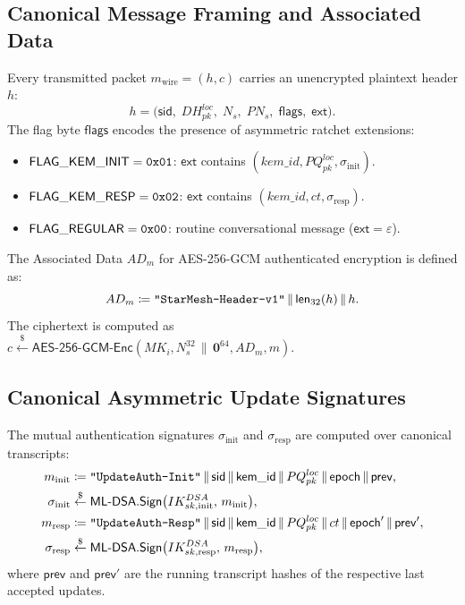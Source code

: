 \documentclass[11pt,a4paper]{article}
\theoremstyle{remark}
\theoremstyle{plain}
\newcommand{\getsr}{\stackrel{\$}{\leftarrow}}
\newcommand{\MLDSA}{\mathsf{ML\text{-}DSA}}
\newcommand{\Sign}{\mathsf{Sign}}
\newcommand{\flen}[1]{\mathsf{len}_{32}(#1)}
\newcommand{\strlit}[1]{\text{\upshape\texttt{"#1"}}}
\newcommand{\hexlit}[1]{\text{\upshape\texttt{#1}}}
\begin{document}
\subsection{Canonical Message Framing and Associated Data}
Every transmitted packet $m_{\mathrm{wire}} = (h, c)$ carries an unencrypted plaintext header $h$:
\[
  h = \bigl(\mathsf{sid},\; DH^{loc}_{pk},\; N_s,\; PN_s,\; \mathsf{flags},\; \mathsf{ext}\bigr).
\]
The flag byte $\mathsf{flags}$ encodes the presence of asymmetric ratchet extensions:
\begin{itemize}
  \item $\mathsf{FLAG\_KEM\_INIT} = \hexlit{0x01}$: $\mathsf{ext}$ contains $(kem\_id, PQ^{loc}_{pk}, \sigma_{\mathrm{init}})$.
  \item $\mathsf{FLAG\_KEM\_RESP} = \hexlit{0x02}$: $\mathsf{ext}$ contains $(kem\_id, ct, \sigma_{\mathrm{resp}})$.
  \item $\mathsf{FLAG\_REGULAR} = \hexlit{0x00}$: routine conversational message ($\mathsf{ext} = \varepsilon$).
\end{itemize}
The Associated Data $AD_m$ for AES-256-GCM authenticated encryption is defined as:
\[
  AD_m \coloneqq \strlit{StarMesh-Header-v1} \,\|\, \flen{h} \,\|\, h.
\]
The ciphertext is computed as $c \getsr \mathsf{AES\text{-}256\text{-}GCM}\text{-}\mathsf{Enc}(MK_i, N_s^{32} \,\|\, \mathbf{0}^{64}, AD_m, m)$.

\subsection{Canonical Asymmetric Update Signatures}
The mutual authentication signatures $\sigma_{\mathrm{init}}$ and $\sigma_{\mathrm{resp}}$ are computed over canonical transcripts:
\begin{align*}
  m_{\mathrm{init}} &\coloneqq \strlit{UpdateAuth-Init} \,\|\, \mathsf{sid} \,\|\, \mathsf{kem\_id} \,\|\, PQ^{loc}_{pk} \,\|\, \mathsf{epoch} \,\|\, \mathsf{prev}, \\
  \sigma_{\mathrm{init}} &\getsr \MLDSA.\Sign\bigl(IK^{DSA}_{sk,\mathrm{init}},\, m_{\mathrm{init}}\bigr), \\
  m_{\mathrm{resp}} &\coloneqq \strlit{UpdateAuth-Resp} \,\|\, \mathsf{sid} \,\|\, \mathsf{kem\_id} \,\|\, PQ^{loc}_{pk} \,\|\, ct \,\|\, \mathsf{epoch}' \,\|\, \mathsf{prev}', \\
  \sigma_{\mathrm{resp}} &\getsr \MLDSA.\Sign\bigl(IK^{DSA}_{sk,\mathrm{resp}},\, m_{\mathrm{resp}}\bigr),
\end{align*}
where $\mathsf{prev}$ and $\mathsf{prev}'$ are the running transcript hashes of the respective last accepted updates.
\end{document}
